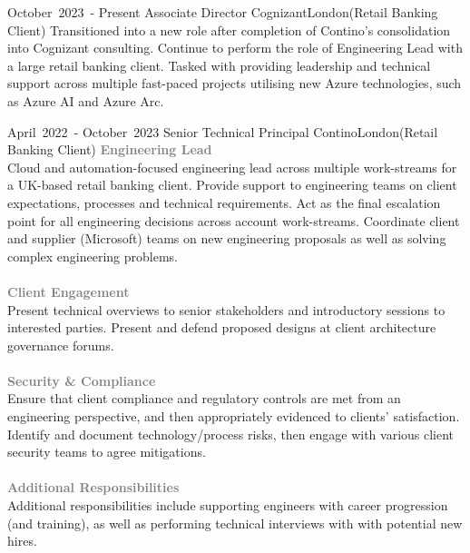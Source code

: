 
\edef\hc{\string:}
\cventry %
  {\mbox{October 2023 -} \mbox{Present}}
  {Associate Director}
  {Cognizant}{London}{(Retail Banking Client)}
  {
    Transitioned into a new role after completion of Contino's consolidation into 
    Cognizant consulting. Continue to perform the role of Engineering Lead with 
    a large retail banking client. Tasked with providing leadership and technical 
    support across multiple fast-paced projects utilising new Azure technologies, 
    such as Azure AI and Azure Arc.
  }


\cventry %
  {\mbox{April 2022 -} \mbox{October 2023}}
  {Senior Technical Principal}
  {Contino}{London}{(Retail Banking Client)}
  {
    \textcolor{gray}{\textbf{Engineering Lead}}\\ 
    Cloud and automation-focused engineering lead across multiple work-streams 
    for a UK-based retail banking client. Provide support to engineering teams
    on client expectations, processes and technical requirements.
    Act as the final escalation point for all engineering decisions across 
    account work-streams. Coordinate client and supplier (Microsoft) teams on
    new engineering proposals as well as solving complex engineering problems.\\\\
    \textcolor{gray}{\textbf{Client Engagement}}\\ 
    Present technical overviews to senior stakeholders and introductory sessions
    to interested parties. Present and defend proposed designs at client 
    architecture governance forums.\\\\
    \textcolor{gray}{\textbf{Security \& Compliance}}\\ 
    Ensure that client compliance and regulatory controls are met from an engineering 
    perspective, and then appropriately evidenced to clients' satisfaction.
    Identify and document technology/process risks, then engage with various client
    security teams to agree mitigations.\\\\
    \textcolor{gray}{\textbf{Additional Responsibilities}}\\ 
    Additional responsibilities include supporting engineers with career
    progression (and training), as well as performing technical interviews with
    with potential new hires.\\
  }

